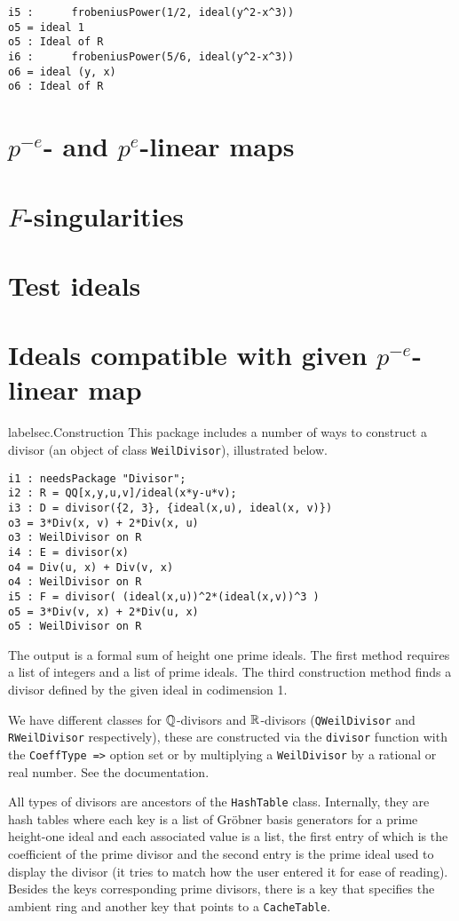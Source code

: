 \documentclass[11pt]{amsart}
\begin{document}
\begin{verbatim}
i5 :      frobeniusPower(1/2, ideal(y^2-x^3))
o5 = ideal 1
o5 : Ideal of R
i6 :      frobeniusPower(5/6, ideal(y^2-x^3))
o6 = ideal (y, x)
o6 : Ideal of R
\end{verbatim}



\section{$p^{-e}$- and $p^{e}$-linear maps}

\section{$F$-singularities}

\section{Test ideals}

\section{Ideals compatible with given $p^{-e}$-linear map}

label{sec.Construction}
This package includes a number of ways to construct a divisor (an object of class {\tt WeilDivisor}), illustrated below.
\begin{verbatim}
i1 : needsPackage "Divisor";
i2 : R = QQ[x,y,u,v]/ideal(x*y-u*v);
i3 : D = divisor({2, 3}, {ideal(x,u), ideal(x, v)})
o3 = 3*Div(x, v) + 2*Div(x, u)
o3 : WeilDivisor on R
i4 : E = divisor(x)
o4 = Div(u, x) + Div(v, x)
o4 : WeilDivisor on R
i5 : F = divisor( (ideal(x,u))^2*(ideal(x,v))^3 )
o5 = 3*Div(v, x) + 2*Div(u, x)
o5 : WeilDivisor on R
\end{verbatim}
The output is a formal sum of height one prime ideals.  The first method requires a list of integers and a list of prime ideals.  The third construction method finds a divisor defined by the given ideal in codimension 1.

We have different classes for $\mathbb{Q}$-divisors and $\mathbb{R}$-divisors ({\tt QWeilDivisor} and {\tt RWeilDivisor} respectively), these are constructed via the {\tt divisor} function with the {\tt CoeffType =>} option set or by multiplying a {\tt WeilDivisor} by a rational or real number.  See the documentation.

All types of divisors are ancestors of the {\tt HashTable} class.  Internally, they are hash tables where each key is a list of Gr\"obner basis generators for a prime height-one ideal and each associated value is a list, the first entry of which is the coefficient of the prime divisor and the second entry is the prime ideal used to display the divisor (it tries to match how the user entered it for ease of reading).  Besides the keys corresponding prime divisors, there is a key that specifies the ambient ring and another key that points to a {\tt CacheTable}.
\end{document}

